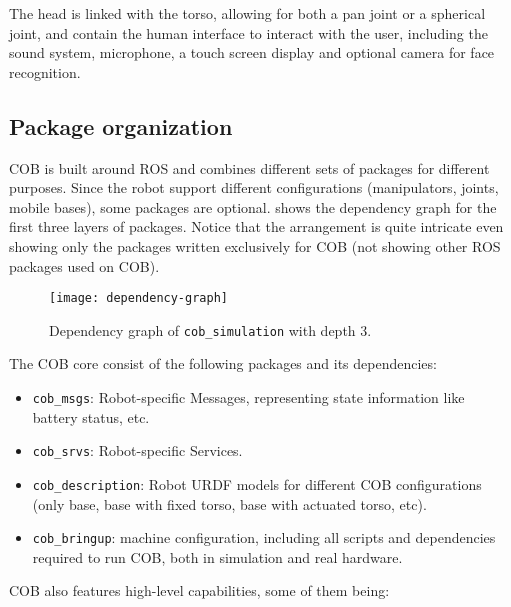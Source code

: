 The head is linked with the torso, allowing for both a pan joint or a spherical joint, and contain the human interface to interact with the user, including the sound system, microphone, a touch screen display and optional camera for face recognition.


\subsection{Package organization}

COB is built around ROS and combines different sets of packages for different purposes. Since the robot support different configurations (manipulators, joints, mobile bases), some packages are optional.  shows the dependency graph for the first three layers of packages. Notice that the arrangement is quite intricate even showing only the packages written exclusively for COB (not showing other ROS packages used on COB).

\begin{figure}[!ht]
\centering
\texttt{[image: dependency-graph]}
\caption{Dependency graph of \texttt{cob\_simulation} with depth 3.}
\label{fig:dependency-graph}
\end{figure}


The COB core consist of the following packages and its dependencies:

\begin{itemize}
\item \texttt{cob\_msgs}: Robot-specific Messages, representing state information like battery status, etc.
\item \texttt{cob\_srvs}: Robot-specific Services.
\item \texttt{cob\_description}: Robot URDF models for different COB configurations (only base, base with fixed torso, base with actuated torso, etc).
\item \texttt{cob\_bringup}: machine configuration, including all scripts and dependencies required to run COB, both in simulation and real hardware.
\end{itemize}

COB also features high-level capabilities, some of them being:

